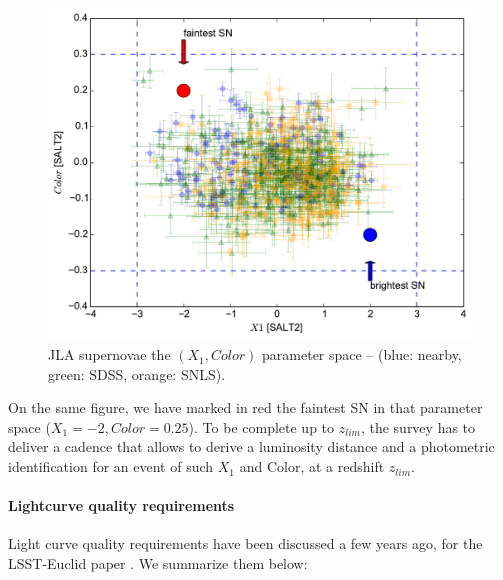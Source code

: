 \documentclass[\docopts]{\docclass}
\begin{document}
\begin{figure}[t]
\begin{center}
\includegraphics[width=0.75\linewidth]{sn_parameter_space.pdf}
\caption{JLA supernovae the $(X_1,Color)$ parameter space -- (blue:
  nearby, green: SDSS, orange: SNLS).  }
\label{fig:jla_X1_C}
\end{center}
\end{figure}

On the same figure, we have marked in red the faintest SN in that
parameter space ($X_1=-2, Color=0.25$). To be complete up to $z_{lim}$,
the survey has to deliver a cadence that allows to derive a luminosity
distance and a photometric identification for an event of such $X_1$
and Color, at a redshift $z_{lim}$.

\paragraph{Lightcurve quality requirements} Light curve quality
requirements have been discussed a few years ago, for the LSST-Euclid
paper \citep{2014A&A...572A..80A}. We summarize them below:
\end{document}
